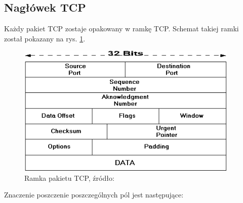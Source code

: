 		\subsection{Nagłówek TCP}
			Każdy pakiet TCP zostaje opakowany w ramkę TCP.
			Schemat takiej ramki został pokazany na rys. \ref{fig:ramka_tcp}.
			\begin{figure}[h]
				\centering
				\includegraphics[width=400px]{tcp.png}
				\caption{Ramka pakietu TCP, źródło: \cite{headers}}
				\label{fig:ramka_tcp}
			\end{figure}
			Znaczenie poszczenie poszczególnych pól jest następujące:
